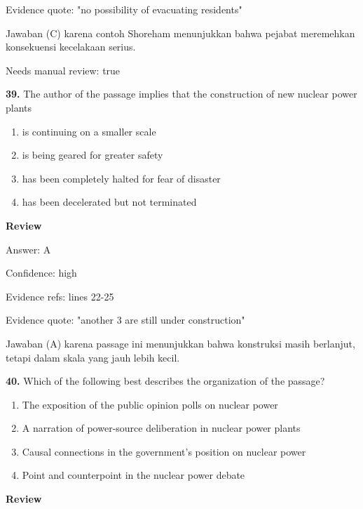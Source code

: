 \documentclass[12pt]{article}
\begin{document}
Evidence quote: "no possibility of evacuating residents"\par
Jawaban (C) karena contoh Shoreham menunjukkan bahwa pejabat meremehkan konsekuensi kecelakaan serius.\par
Needs manual review: true\par
\endgroup
\par
\vspace{0.25\baselineskip}
\noindent\textbf{39.} The author of the passage implies that the construction of new nuclear power plants
\begin{enumerate}[label=(\Alph*),leftmargin=*,itemsep=0.2em]
\item is continuing on a smaller scale
\item is being geared for greater safety
\item has been completely halted for fear of disaster
\item has been decelerated but not terminated
\end{enumerate}
\par
\begingroup
\setlength{\parskip}{0pt}
\setlength{\parindent}{0pt}
\textbf{Review}\par
Answer: A\par
Confidence: high\par
Evidence refs: lines 22-25\par
Evidence quote: "another 3 are still under construction"\par
Jawaban (A) karena passage ini menunjukkan bahwa konstruksi masih berlanjut, tetapi dalam skala yang jauh lebih kecil.\par
\endgroup
\par
\vspace{0.25\baselineskip}
\noindent\textbf{40.} Which of the following best describes the organization of the passage?
\begin{enumerate}[label=(\Alph*),leftmargin=*,itemsep=0.2em]
\item The exposition of the public opinion polls on nuclear power
\item A narration of power-source deliberation in nuclear power plants
\item Causal connections in the government's position on nuclear power
\item Point and counterpoint in the nuclear power debate
\end{enumerate}
\par
\begingroup
\setlength{\parskip}{0pt}
\setlength{\parindent}{0pt}
\textbf{Review}\par
\end{document}
